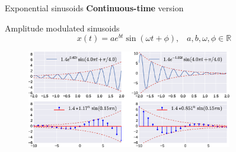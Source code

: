 \documentclass[aspectratio=169]{beamer}
\let\olditem\item
\renewcommand{\item}{\setlength{\itemsep}{\fill}\olditem}
\begin{document}
\begin{frame}[t]
\end{frame}


\begin{frame}{Exponential sinusoids}
\textbf{Continuous-time} version

Amplitude modulated sinusoids
\[ x(t) = a e^{bt} \sin \left(\omega t + \phi \right), \,\,\,\,\, a, b, \omega, \phi \in \mathbb{R}\]

\begin{figure}
\includegraphics[width=0.8\textwidth]{img/exp_sin.eps}
\end{figure}

\end{frame}



\end{document}
